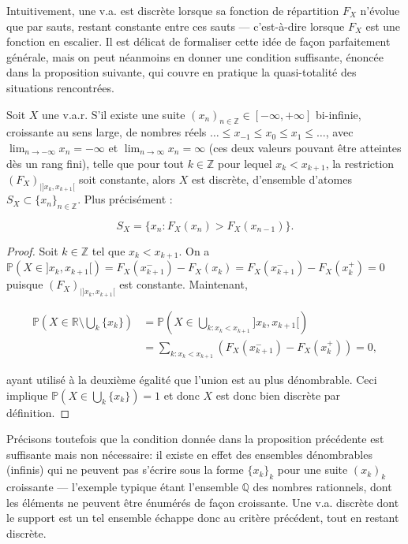 Intuitivement, une v.a. est discrète lorsque sa fonction de répartition $F_X$ n'évolue que par sauts, restant constante entre ces sauts — c'est-à-dire lorsque $F_X$ est une fonction en escalier. Il est délicat de formaliser cette idée de façon parfaitement générale, mais on peut néanmoins en donner une condition suffisante, énoncée dans la proposition suivante, qui couvre en pratique la quasi-totalité des situations rencontrées.

\begin{mdframed}
\begin{proposition}
Soit $X$ une v.a.r. S'il existe une suite $(x_n)_{n \in \mathbb{Z}} \in [-\infty, +\infty]$ bi-infinie, croissante au sens large, de nombres réels $\dots \leq x_{-1} \leq x_0 \leq x_1 \leq \dots$, avec $\lim_{n \to -\infty} x_n = -\infty$ et $\lim_{n \to \infty} x_n = \infty$ (ces deux valeurs pouvant être atteintes dès un rang fini), telle que pour tout $k \in \mathbb{Z}$ pour lequel $x_k < x_{k+1}$, la restriction $(F_X)_{|]x_k, x_{k+1}[}$ soit constante, alors $X$ est discrète, d'ensemble d'atomes $S_X \subset \{x_n\}_{n \in \mathbb{Z}}$. Plus précisément :

$$
S_X = \{x_n : F_X(x_n) > F_X(x_{n-1})\}.
$$
\end{proposition}
\end{mdframed}

\begin{proof} 
Soit $k \in \mathbb{Z}$ tel que $x_k < x_{k+1}$. On a $\mathbb{P}(X \in ]x_k, x_{k+1}[) = F_X(x_{k+1}^-) - F_X(x_k) = F_X(x_{k+1}^-) - F_X(x_k^+) = 0$ puisque $(F_X)_{|]x_k, x_{k+1}[}$ est constante. Maintenant,

\begin{align*}
\mathbb{P}\left(X \in \mathbb{R} \setminus \bigcup_k \{x_k\}\right) &= \mathbb{P}\left(X \in \bigcup_{k : x_k < x_{k+1}} ]x_k, x_{k+1}[\right) \\
&= \sum_{k : x_k < x_{k+1}} (F_X(x_{k+1}^-) - F_X(x_k^+)) = 0,
\end{align*}

ayant utilisé à la deuxième égalité que l'union est au plus dénombrable. Ceci implique $\mathbb{P}\left(X \in \bigcup_k \{x_k\}\right) = 1$ et donc $X$ est donc bien discrète par définition.
\end{proof}

Précisons toutefois que la condition donnée dans la proposition précédente est suffisante mais non nécessaire: il existe en effet des ensembles dénombrables (infinis) qui ne peuvent pas s'écrire sous la forme $\{x_k\}_k$ pour une suite $(x_k)_k$ croissante — l'exemple typique étant l'ensemble $\mathbb{Q}$ des nombres rationnels, dont les éléments ne peuvent être énumérés de façon croissante. Une v.a. discrète dont le support est un tel ensemble échappe donc au critère précédent, tout en restant discrète.

